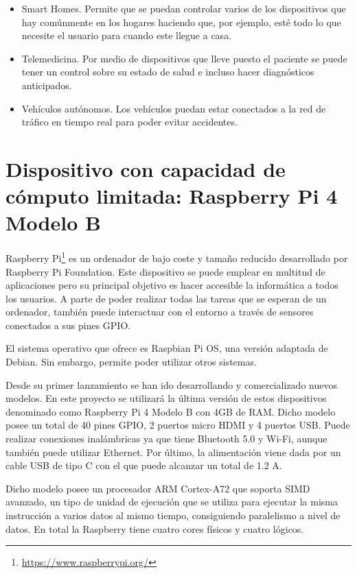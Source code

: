 \documentclass[a4paper, 12pt]{book}
\begin{document}
\begin{itemize}
    \item Smart Homes. Permite que se puedan controlar varios de los dispositivos que hay comúnmente en los hogares haciendo que, por ejemplo, esté todo lo que necesite el usuario para cuando este llegue a casa.
    \item Telemedicina. Por medio de dispositivos que lleve puesto el paciente se puede tener un control sobre su estado de salud e incluso hacer diagnósticos anticipados.
    \item Vehículos autónomos. Los vehículos puedan estar conectados a la red de tráfico en tiempo real para poder evitar accidentes.
\end{itemize}

\section{Dispositivo con capacidad de cómputo limitada: Raspberry Pi 4 Modelo B}
\label{sec:dispositivo_hardware}

Raspberry Pi\footnote{\url{https://www.raspberrypi.org/}} es un ordenador de bajo coste y tamaño reducido desarrollado por Raspberry Pi Foundation. Este dispositivo se puede emplear en  multitud de aplicaciones pero su principal objetivo es hacer accesible la informática a todos los usuarios. A parte de poder realizar todas las tareas que se esperan de un ordenador, también puede interactuar con el entorno a través de sensores conectados a sus pines GPIO.

El sistema operativo que ofrece es Raspbian Pi OS, una versión adaptada de Debian. Sin embargo, permite poder utilizar otros sistemas.

Desde su primer lanzamiento se han ido desarrollando y comercializado nuevos modelos. En este proyecto se utilizará la última versión de estos dispositivos denominado como Raspberry Pi 4 Modelo B con 4GB de RAM. Dicho modelo posee un total de 40 pines GPIO, 2 puertos micro HDMI y 4 puertos USB. Puede realizar conexiones inalámbricas ya que tiene Bluetooth 5.0 y Wi-Fi, aunque también puede utilizar Ethernet. Por último, la alimentación viene dada por un cable USB de tipo C con el que puede alcanzar un total de 1.2 A.

Dicho modelo posee un procesador ARM Cortex-A72 que soporta SIMD avanzado, un tipo de unidad de ejecución que se utiliza para ejecutar la misma instrucción a varios datos al mismo tiempo, consiguiendo paralelismo a nivel de datos. En total la Raspberry tiene cuatro cores físicos y cuatro lógicos. 
\end{document}

